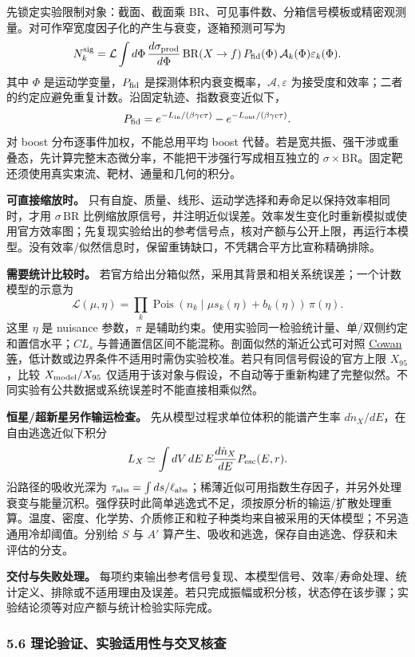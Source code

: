 \documentclass[
  chinese,
  UTF8]{ctexart}
\begin{document}
先锁定实验限制对象：截面、截面乘
BR、可见事件数、分箱信号模板或精密观测量。对可作窄宽度因子化的产生与衰变，逐箱预测可写为
\[
N_k^{\rm sig}=\mathcal L\int d\Phi\,
\frac{d\sigma_{\rm prod}}{d\Phi}\,
\mathrm{BR}(X\to f)\,P_{\rm fid}(\Phi)\,
\mathcal A_k(\Phi)\varepsilon_k(\Phi).
\] 其中 \(\Phi\) 是运动学变量，\(P_{\rm fid}\)
是探测体积内衰变概率，\(\mathcal A,\varepsilon\)
为接受度和效率；二者的约定应避免重复计数。沿固定轨迹、指数衰变近似下，
\[
P_{\rm fid}=e^{-L_{\rm in}/(\beta\gamma c\tau)}
-e^{-L_{\rm out}/(\beta\gamma c\tau)}.
\] 对 boost 分布逐事件加权，不能总用平均 boost
代替。若是宽共振、强干涉或重叠态，先计算完整末态微分率，不能把干涉强行写成相互独立的
\(\sigma\times\mathrm{BR}\)。固定靶还须使用真实束流、靶材、通量和几何的积分。

\textbf{可直接缩放时。}
只有自旋、质量、线形、运动学选择和寿命足以保持效率相同时，才用
\(\sigma\,\mathrm{BR}\)
比例缩放原信号，并注明近似误差。效率发生变化时重新模拟或使用官方效率图；先复现实验给出的参考信号点，核对产额与公开上限，再运行本模型。没有效率/似然信息时，保留重铸缺口，不凭耦合平方比宣称精确排除。

\textbf{需要统计比较时。}
若官方给出分箱似然，采用其背景和相关系统误差；一个计数模型的示意为 \[
\mathscr L(\mu,\eta)=\prod_k\operatorname{Pois}
(n_k\mid\mu s_k(\eta)+b_k(\eta))\,\pi(\eta).
\] 这里 \(\eta\) 是 nuisance 参数，\(\pi\)
是辅助约束。使用实验同一检验统计量、单/双侧约定和置信水平；\(CL_s\)
与普通置信区间不能混称。剖面似然的渐近公式可对照
\href{https://arxiv.org/abs/1007.1727}{Cowan
等}，低计数或边界条件不适用时需伪实验校准。若只有同信号假设的官方上限
\(X_{95}\)，比较 \(X_{\rm model}/X_{95}\)
仅适用于该对象与假设，不自动等于重新构建了完整似然。不同实验有公共数据或系统误差时不能直接相乘似然。

\textbf{恒星/超新星另作输运检查。} 先从模型过程求单位体积的能谱产生率
\(d\dot n_X/dE\)，在自由逃逸近似下积分 \[
L_X\simeq\int dV\,dE\,E\frac{d\dot n_X}{dE}P_{\rm esc}(E,r).
\] 沿路径的吸收光深为
\(\tau_{\rm abs}=\int ds/\ell_{\rm abs}\)；稀薄近似可用指数生存因子，并另外处理衰变与能量沉积。强俘获时此简单逃逸式不足，须按原分析的输运/扩散处理重算。温度、密度、化学势、介质修正和粒子种类均来自被采用的天体模型；不另造通用冷却阈值。分别给
\(S\) 与 \(A'\) 算产生、吸收和逃逸，保存自由逃逸、俘获和未评估的分支。

\textbf{交付与失败处理。}
每项约束输出参考信号复现、本模型信号、效率/寿命处理、统计定义、排除或不适用理由及误差。若只完成振幅或积分核，状态停在该步骤；实验结论须等对应产额与统计检验实际完成。

\subsubsection{5.6 理论验证、实验适用性与交叉核查}\label{major-4-step-6}
\end{document}
